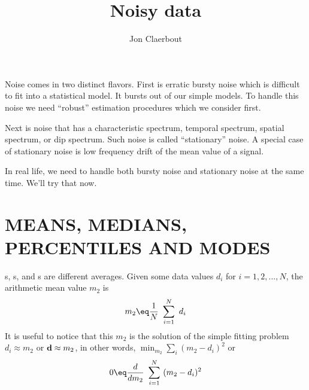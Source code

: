 
\title{Noisy data}
\author{Jon Claerbout}
\maketitle
\label{paper:noiz}


Noise comes in two distinct flavors.
First is erratic bursty noise
which is difficult to fit into a statistical model.
It bursts out of our simple models.
To handle this noise we need ``robust'' estimation procedures
which we consider first.

\par
Next is noise that has a characteristic spectrum,
temporal spectrum, spatial spectrum, or dip spectrum.
Such noise is called ``stationary'' noise.
A special case of stationary noise is
low frequency drift of the mean value of a signal.

\par
In real life, we need to handle both bursty noise
and stationary noise at the same time.
We'll try that now.

\section{MEANS, MEDIANS, PERCENTILES AND MODES}
s, s, and s are different averages.
Given some data values $d_i$ for $i=1,2,...,N$,
the arithmetic mean value $m_2$ is
\begin{equation}
m_2 \eq \frac{1 }{ N} \ \sum_{i=1}^N \ d_i
\end{equation}
It is useful to notice that this $m_2$ is the solution
of the simple fitting problem
$ d_i \approx m_2$ or
$\bold d \approx m_2$,
in other words, $\min_{m_2} \sum_i (m_2-d_i)^2$ or
\begin{equation}
0 \eq \frac{d }{ dm_2} \ \sum_{i=1}^N \ (m_2-d_i)^2
\end{equation}

